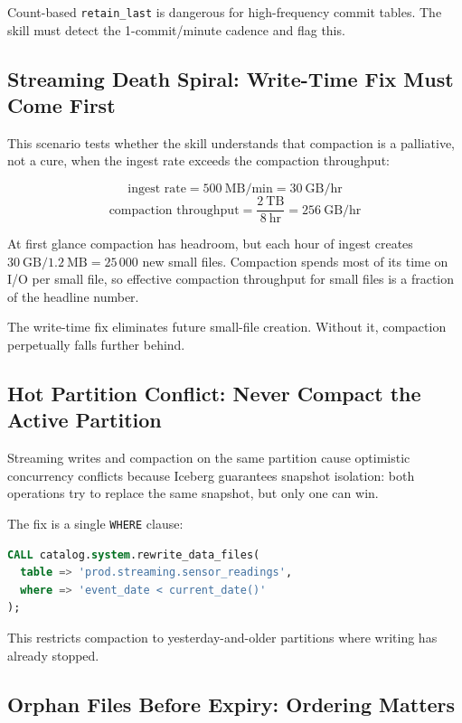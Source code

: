 \documentclass[11pt,a4paper]{article}
\newcommand{\code}[1]{\texttt{#1}}
\begin{document}
Count-based \code{retain\_last} is dangerous for high-frequency commit tables.
The skill must detect the 1-commit/minute cadence and flag this.

\subsection{Streaming Death Spiral: Write-Time Fix Must Come First}

This scenario tests whether the skill understands that compaction is a
palliative, not a cure, when the ingest rate exceeds the compaction throughput:

\[
  \text{ingest rate} = 500\ \text{MB/min} = 30\ \text{GB/hr}
\]
\[
  \text{compaction throughput} = \frac{2\ \text{TB}}{8\ \text{hr}} = 256\ \text{GB/hr}
\]

At first glance compaction has headroom, but each hour of ingest creates
$30\ \text{GB} / 1.2\ \text{MB} = 25\,000$ new small files.  Compaction
spends most of its time on I/O per small file, so effective compaction
throughput for small files is a fraction of the headline number.

The write-time fix eliminates future small-file creation.  Without it,
compaction perpetually falls further behind.

\subsection{Hot Partition Conflict: Never Compact the Active Partition}

Streaming writes and compaction on the same partition cause optimistic
concurrency conflicts because Iceberg guarantees snapshot isolation: both
operations try to replace the same snapshot, but only one can win.

The fix is a single \code{WHERE} clause:

\begin{lstlisting}[language=sql]
CALL catalog.system.rewrite_data_files(
  table => 'prod.streaming.sensor_readings',
  where => 'event_date < current_date()'
);
\end{lstlisting}

\noindent This restricts compaction to yesterday-and-older partitions where
writing has already stopped.

\subsection{Orphan Files Before Expiry: Ordering Matters}
\end{document}
